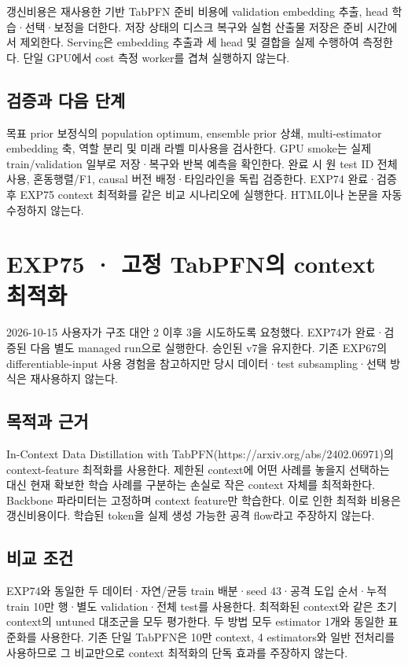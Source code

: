 갱신비용은 재사용한 기반 TabPFN 준비 비용에 validation embedding 추출, head 학습·선택·보정을 더한다. 저장 상태의 디스크 복구와 실험 산출물 저장은 준비 시간에서 제외한다. Serving은 embedding 추출과 세 head 및 결합을 실제 수행하여 측정한다. 단일 GPU에서 cost 측정 worker를 겹쳐 실행하지 않는다.

\subsection{검증과 다음 단계}
목표 prior 보정식의 population optimum, ensemble prior 상쇄, multi-estimator embedding 축, 역할 분리 및 미래 라벨 미사용을 검사한다. GPU smoke는 실제 train/\allowbreak{}validation 일부로 저장·복구와 반복 예측을 확인한다. 완료 시 원 test ID 전체 사용, 혼동행렬/\allowbreak{}F1, causal 버전 배정·타임라인을 독립 검증한다. EXP74 완료·검증 후 EXP75 context 최적화를 같은 비교 시나리오에 실행한다. HTML이나 논문을 자동 수정하지 않는다.



\section{EXP75 · 고정 TabPFN의 context 최적화}
2026-10-15 사용자가 구조 대안 2 이후 3을 시도하도록 요청했다. EXP74가 완료·검증된 다음 별도 managed run으로 실행한다. 승인된 v7을 유지한다. 기존 EXP67의 differentiable-input 사용 경험을 참고하지만 당시 데이터·test subsampling·선택 방식은 재사용하지 않는다.

\subsection{목적과 근거}
In-Context Data Distillation with TabPFN(https:/\allowbreak{}/\allowbreak{}arxiv.org/\allowbreak{}abs/\allowbreak{}2402.06971)의 context-feature 최적화를 사용한다. 제한된 context에 어떤 사례를 놓을지 선택하는 대신 현재 확보한 학습 사례를 구분하는 손실로 작은 context 자체를 최적화한다. Backbone 파라미터는 고정하며 context feature만 학습한다. 이로 인한 최적화 비용은 갱신비용이다. 학습된 token을 실제 생성 가능한 공격 flow라고 주장하지 않는다.

\subsection{비교 조건}
EXP74와 동일한 두 데이터·자연/\allowbreak{}균등 train 배분·seed 43·공격 도입 순서·누적 train 10만 행·별도 validation·전체 test를 사용한다. 최적화된 context와 같은 초기 context의 untuned 대조군을 모두 평가한다. 두 방법 모두 estimator 1개와 동일한 표준화를 사용한다. 기존 단일 TabPFN은 10만 context, 4 estimators와 일반 전처리를 사용하므로 그 비교만으로 context 최적화의 단독 효과를 주장하지 않는다.


